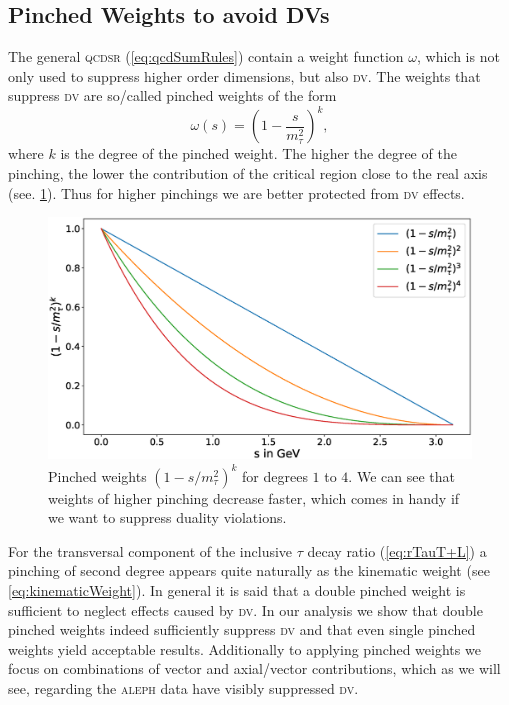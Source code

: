 \documentclass[../../index.tex]{subfiles}
\begin{document}
\subsection{Pinched Weights to avoid DVs}
\label{sec:pinchedWeights}
The general \textsc{qcdsr} (\cref{eq:qcdSumRules}) contain a weight function
\(\omega\), which is not only used to suppress higher order dimensions, but also
\textsc{dv}. The weights that suppress \textsc{dv} are so\-/called pinched
weights of the form
\begin{equation}
  \omega(s) = \left(1-\frac{s}{m_\tau^2}\right)^k,
\end{equation}
where \(k\) is the degree of the pinched weight. The higher the degree of the
pinching, the lower the contribution of the critical region close to the real
axis (see. \cref{fig:monomialWeightGraphs}). Thus for higher pinchings we are
better protected from \textsc{dv} effects.
\begin{figure}
  \centering
  \includegraphics[width=\textwidth]{./images/monomialWeightGraphs.eps}
  \caption{Pinched weights \((1-s/m_\tau^2)^k\) for degrees \(1\) to \(4\). We
    can see that weights of higher pinching decrease faster, which comes in
    handy if we want to suppress duality violations.}
  \label{fig:monomialWeightGraphs}
\end{figure}
For the transversal component of the inclusive \(\tau\) decay ratio
(\cref{eq:rTauT+L}) a pinching of second degree appears quite naturally as the
kinematic weight (see \cref{eq:kinematicWeight}). In general it is said that a
double pinched weight is sufficient to neglect effects caused by \textsc{dv}. In
our analysis we show that double pinched weights indeed sufficiently suppress
\textsc{dv} and that even single pinched weights yield acceptable results.
Additionally to applying pinched weights we focus on combinations of vector and
axial\-/vector contributions, which as we will see, regarding the \textsc{aleph}
data have visibly suppressed \textsc{dv}.
\end{document}
